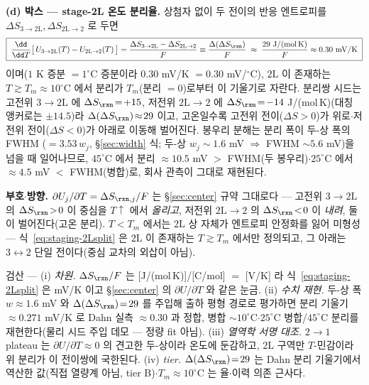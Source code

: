 \textbf{(d) 박스 --- stage-2L 온도 분리율.} 상첨자 없이 두 전이의 반응 엔트로피를
$\Delta S_{3\to2\mathrm L},\Delta S_{2\mathrm L\to2}$ 로 두면
\begin{equation}
\boxed{\;\frac{\dd}{\dd T}\big[\,U_{3\to2\mathrm L}(T)-U_{2\mathrm L\to2}(T)\,\big]
=\frac{\Delta S_{3\to2\mathrm L}-\Delta S_{2\mathrm L\to2}}{F}
\equiv\frac{\Delta(\Delta S_\rxn)}{F}
\;\approx\;\frac{29\ \mathrm{J/(mol\,K)}}{F}\approx0.30\ \mathrm{mV/K}\;}
\label{eq:staging-2Lsplit}
\end{equation}
이며($1$ K 증분 $=1^\circ$C 증분이라 $0.30$ mV/K $=0.30$ mV/$^\circ$C), $2\mathrm L$ 이 존재하는 $T\!\gtrsim\!T_m\!\approx\!10^\circ$C
에서 분리가 $T_m$(분리 $=0$)로부터 이 기울기로 자란다. 분리쌍 시드는 고전위 $3\!\to\!2\mathrm L$ 에
$\Delta S_\rxn\!=\!+15$, 저전위 $2\mathrm L\!\to\!2$ 에 $\Delta S_\rxn\!=\!-14$ J/(mol\,K)(대칭 앵커로는
$\pm14.5$)라 $\Delta(\Delta S_\rxn)\!\approx\!29$ 이고, 고온일수록 고전위 전이($\Delta S\!>\!0$)가 위로$\cdot$저전위
전이($\Delta S\!<\!0$)가 아래로 이동해 벌어진다. 봉우리 분해는 분리 폭이 두-상 폭의 FWHM
($=3.53\,w_j$, \S\ref{sec:width} 식; 두-상 $w_j\!\sim\!1.6$ mV $\Rightarrow$ FWHM $\sim\!5.6$ mV)을 넘을 때 일어나므로,
$45^\circ$C 에서 분리 $\approx\!10.5$ mV $>$ FWHM(두 봉우리)$\cdot$$25^\circ$C 에서 $\approx\!4.5$ mV $<$ FWHM(병합)로,
회사 관측이 그대로 재현된다.
\begin{signbox}
\textbf{부호$\cdot$방향.} $\partial U_j/\partial T=\Delta S_{\rxn,j}/F$ 는 \S\ref{sec:center} 규약 그대로다 ---
고전위 $3\!\to\!2\mathrm L$ 의 $\Delta S_\rxn\!>\!0$ 이 중심을 $T\!\uparrow$ 에서 \emph{올리고}, 저전위 $2\mathrm L\!\to\!2$ 의
$\Delta S_\rxn\!<\!0$ 이 \emph{내려}, 둘이 벌어진다(고온 분리). $T\!<\!T_m$ 에서는 $2\mathrm L$ 상 자체가
엔트로피 안정화를 잃어 미형성 --- 식~\eqref{eq:staging-2Lsplit} 은 $2\mathrm L$ 이 존재하는 $T\!\gtrsim\!T_m$ 에서만
정의되고, 그 아래는 $3\!\leftrightarrow\!2$ 단일 전이다(중심 교차의 외삽이 아님).
\end{signbox}
\begin{verifybox}
검산 --- (i) \emph{차원.} $\Delta S_\rxn/F$ 는 [J/(mol\,K)]/[C/mol] $=$ [V/K] 라 식~\eqref{eq:staging-2Lsplit} 은
mV/K 이고 \S\ref{sec:center} 의 $\partial U/\partial T$ 와 같은 눈금. (ii) \emph{수치 재현.} 두-상 폭
$w\!\approx\!1.6$ mV 와 $\Delta(\Delta S_\rxn)\!=\!29$ 를 주입해 출하 평형 경로로 평가하면 분리 기울기
$\approx0.271$ mV/K 로 Dahn 실측 $\approx0.30$ 과 정합, 병합 $\sim\!10^\circ$C$\cdot$$25^\circ$C 병합/$45^\circ$C 분리를
재현한다(물리 시드 주입 데모 --- 정량 fit 아님). (iii) \emph{열역학 서명 대조.} $2\!\to\!1$ plateau 는
$\partial U/\partial T\!\approx\!0$ 의 견고한 두-상이라 온도에 둔감하고\cite{reynier2003}, $2\mathrm L$ 구역만
$T$-민감이라 위 분리가 이 전이쌍에 국한된다. (iv) \emph{tier.} $\Delta(\Delta S_\rxn)\!=\!29$ 는 Dahn 분리
기울기에서 역산한 값(직접 열량계 아님, tier B)$\cdot$$T_m\!\approx\!10^\circ$C 는 율$\cdot$이력 의존 근사다.
\end{verifybox}

